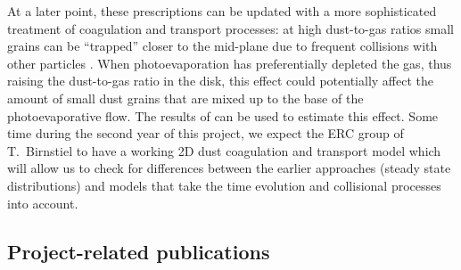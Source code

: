 \documentclass[10pt,fleqn,twoside]{article}
\begin{document}
At a later point, these prescriptions can be updated with a more
sophisticated treatment of coagulation and transport processes: at
high dust-to-gas ratios small grains can be ``trapped'' closer to the
mid-plane due to frequent collisions with other particles
\citep{2016ApJ...822..111K}. When photoevaporation has preferentially
depleted the gas, thus raising the dust-to-gas ratio in the disk, this
effect could potentially affect the amount of small dust grains that
are mixed up to the base of the photoevaporative flow. The results of
\citet{2016ApJ...822..111K} can be used to estimate this effect.
Some time during the second  year of this project, we expect the ERC
group of T.\ Birnstiel to have a working 2D dust coagulation and
transport model which will allow us to check for differences between
the earlier approaches (steady state distributions) and models that
take the time evolution and collisional processes into account.

\subsection{Project-related publications}


\end{document}
